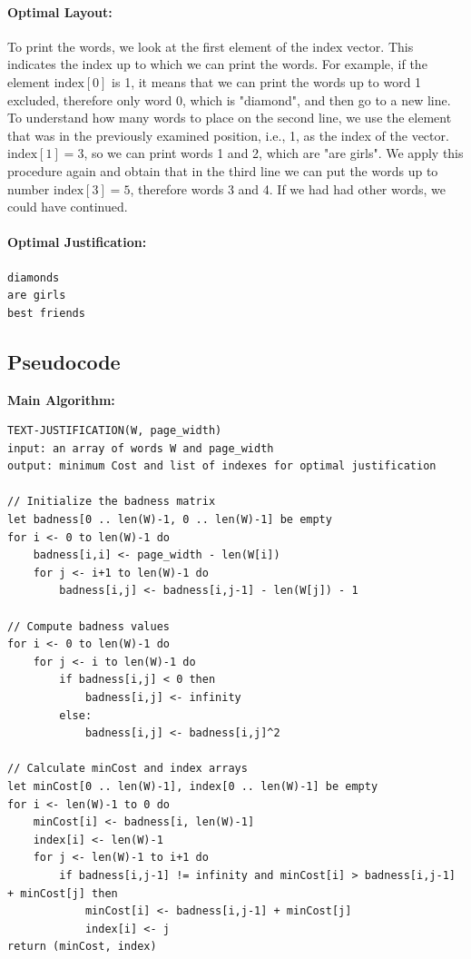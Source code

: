 \paragraph{Optimal Layout:}
To print the words, we look at the first element of the $\text{index}$ vector. This indicates the index up to which we can print the words. For example, if the element $\text{index}[0]$ is 1, it means that we can print the words up to word 1 excluded, therefore only word 0, which is "diamond", and then go to a new line. To understand how many words to place on the second line, we use the element that was in the previously examined position, i.e., 1, as the index of the vector. $\text{index}[1] = 3$, so we can print words 1 and 2, which are "are girls". We apply this procedure again and obtain that in the third line we can put the words up to number $\text{index}[3] = 5$, therefore words 3 and 4. If we had had other words, we could have continued.
\paragraph{Optimal Justification:}
\begin{verbatim}
diamonds
are girls
best friends
\end{verbatim}

\subsection{Pseudocode}
\textbf{Main Algorithm:}
\begin{verbatim}
TEXT-JUSTIFICATION(W, page_width)
input: an array of words W and page_width
output: minimum Cost and list of indexes for optimal justification

// Initialize the badness matrix
let badness[0 .. len(W)-1, 0 .. len(W)-1] be empty
for i <- 0 to len(W)-1 do
    badness[i,i] <- page_width - len(W[i])
    for j <- i+1 to len(W)-1 do
        badness[i,j] <- badness[i,j-1] - len(W[j]) - 1

// Compute badness values
for i <- 0 to len(W)-1 do
    for j <- i to len(W)-1 do
        if badness[i,j] < 0 then
            badness[i,j] <- infinity
        else:
            badness[i,j] <- badness[i,j]^2

// Calculate minCost and index arrays
let minCost[0 .. len(W)-1], index[0 .. len(W)-1] be empty
for i <- len(W)-1 to 0 do
    minCost[i] <- badness[i, len(W)-1]
    index[i] <- len(W)-1
    for j <- len(W)-1 to i+1 do
        if badness[i,j-1] != infinity and minCost[i] > badness[i,j-1] + minCost[j] then
            minCost[i] <- badness[i,j-1] + minCost[j]
            index[i] <- j
return (minCost, index)
\end{verbatim}


